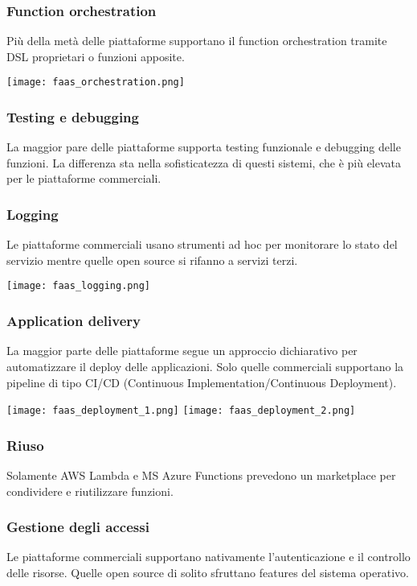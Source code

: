\subsubsection{Function orchestration}
Più della metà delle piattaforme supportano il function orchestration tramite DSL proprietari o funzioni apposite.
\begin{center}
	\texttt{[image: faas\_orchestration.png]}
\end{center}

\subsubsection{Testing e debugging}
La maggior pare delle piattaforme supporta testing funzionale e debugging delle funzioni. La differenza sta nella sofisticatezza di questi sistemi, che è più elevata per le piattaforme commerciali.
\subsubsection{Logging}
Le piattaforme commerciali usano strumenti ad hoc per monitorare lo stato del servizio mentre quelle open source si rifanno a servizi terzi.
\begin{center}
	\texttt{[image: faas\_logging.png]}
\end{center}
\subsubsection{Application delivery}
La maggior parte delle piattaforme segue un approccio dichiarativo per automatizzare il deploy delle applicazioni. Solo quelle commerciali supportano la pipeline di tipo CI/CD (Continuous Implementation/Continuous Deployment).
\begin{center}
	\texttt{[image: faas\_deployment\_1.png]}
	\texttt{[image: faas\_deployment\_2.png]}
\end{center}
\subsubsection{Riuso}
Solamente AWS Lambda e MS Azure Functions prevedono un marketplace per condividere e riutilizzare funzioni.
\subsubsection{Gestione degli accessi}
Le piattaforme commerciali supportano nativamente l'autenticazione e il controllo delle risorse. Quelle open source di solito sfruttano features del sistema operativo.
